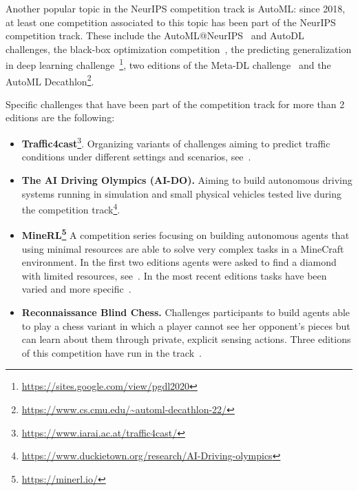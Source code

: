 \documentclass[twoside,11pt]{article}
\begin{document}
Another popular topic in the NeurIPS competition track is AutoML: since 2018, at least one competition associated to this topic has been part of  the NeurIPS competition track. These include the AutoML@NeurIPS~\citep{DBLP:journals/corr/abs-1903-05263}  and AutoDL~\citep{ChaLearnAutoDL2019} challenges, the black-box optimization competition~\citep{pmlr-v133-turner21a}, the predicting generalization in deep learning challenge~\footnote{\url{https://sites.google.com/view/pgdl2020}}, two editions of the Meta-DL challenge~\citep{elbaz:hal-03688638,https://doi.org/10.48550/arxiv.2208.14686} and the AutoML Decathlon\footnote{\url{https://www.cs.cmu.edu/~automl-decathlon-22/}}. %

Specific  challenges that have been part of the competition track for more than 2 editions are the following: 
\begin{itemize}
    \item \textbf{Traffic4cast}\footnote{\url{https://www.iarai.ac.at/traffic4cast/}}. Organizing variants of challenges aiming to predict traffic conditions under different settings and scenarios, see~\citep{pmlr-v123-kreil20a,pmlr-v133-kopp21a,pmlr-v176-eichenberger22a}. 
    \item \textbf{The AI Driving Olympics (AI-DO).} Aiming to build autonomous driving systems running in simulation and small physical vehicles tested live during the competition track\footnote{\url{https://www.duckietown.org/research/AI-Driving-olympics}}.
    \item \textbf{MineRL\footnote{\url{https://minerl.io/}}} A competition series focusing on building autonomous agents that using minimal resources are able to solve very complex tasks in a MineCraft environment. In the first two editions agents were asked to find a diamond  with limited resources, see~\citep{pmlr-v123-milani20a,pmlr-v133-guss21a}. In the most recent editions tasks have been varied and more specific~\citep{https://doi.org/10.48550/arxiv.2204.07123}.  
    \item \textbf{Reconnaissance Blind Chess.} Challenges participants to build agents able to play a chess variant in which a player cannot see her
opponent’s pieces but can learn about them through private, explicit sensing actions. Three editions of this competition have run in the track~\citep{pmlr-v123-gardner20a}. 
\end{itemize}
\end{document}
